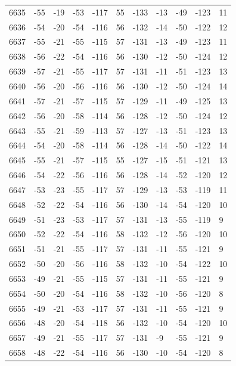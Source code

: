 \begin{table}[H]
\begin{tabular}{lllllllllll}
6635 & -55 & -19 & -53 & -117 & 55 & -133 & -13 & -49 & -123 & 11 \\
6636 & -54 & -20 & -54 & -116 & 56 & -132 & -14 & -50 & -122 & 12 \\
6637 & -55 & -21 & -55 & -115 & 57 & -131 & -13 & -49 & -123 & 11 \\
6638 & -56 & -22 & -54 & -116 & 56 & -130 & -12 & -50 & -124 & 12 \\
6639 & -57 & -21 & -55 & -117 & 57 & -131 & -11 & -51 & -123 & 13 \\
6640 & -56 & -20 & -56 & -116 & 56 & -130 & -12 & -50 & -124 & 14 \\
6641 & -57 & -21 & -57 & -115 & 57 & -129 & -11 & -49 & -125 & 13 \\
6642 & -56 & -20 & -58 & -114 & 56 & -128 & -12 & -50 & -124 & 12 \\
6643 & -55 & -21 & -59 & -113 & 57 & -127 & -13 & -51 & -123 & 13 \\
6644 & -54 & -20 & -58 & -114 & 56 & -128 & -14 & -50 & -122 & 14 \\
6645 & -55 & -21 & -57 & -115 & 55 & -127 & -15 & -51 & -121 & 13 \\
6646 & -54 & -22 & -56 & -116 & 56 & -128 & -14 & -52 & -120 & 12 \\
6647 & -53 & -23 & -55 & -117 & 57 & -129 & -13 & -53 & -119 & 11 \\
6648 & -52 & -22 & -54 & -116 & 56 & -130 & -14 & -54 & -120 & 10 \\
6649 & -51 & -23 & -53 & -117 & 57 & -131 & -13 & -55 & -119 & 9 \\
6650 & -52 & -22 & -54 & -116 & 58 & -132 & -12 & -56 & -120 & 10 \\
6651 & -51 & -21 & -55 & -117 & 57 & -131 & -11 & -55 & -121 & 9 \\
6652 & -50 & -20 & -56 & -116 & 58 & -132 & -10 & -54 & -122 & 10 \\
6653 & -49 & -21 & -55 & -115 & 57 & -131 & -11 & -55 & -121 & 9 \\
6654 & -50 & -20 & -54 & -116 & 58 & -132 & -10 & -56 & -120 & 8 \\
6655 & -49 & -21 & -53 & -117 & 57 & -131 & -11 & -55 & -121 & 9 \\
6656 & -48 & -20 & -54 & -118 & 56 & -132 & -10 & -54 & -120 & 10 \\
6657 & -49 & -21 & -55 & -117 & 57 & -131 & -9 & -55 & -121 & 9 \\
6658 & -48 & -22 & -54 & -116 & 56 & -130 & -10 & -54 & -120 & 8 \\

\end{tabular}
\end{table}

